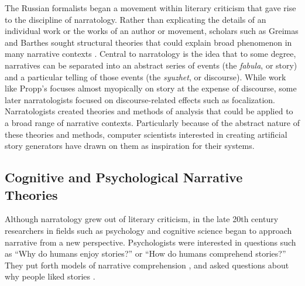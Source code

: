 The Russian formalists began a movement within literary criticism that gave rise to the discipline of narratology.
%
Rather than explicating the details of an individual work or the works of an author or movement, scholars such as Greimas and Barthes sought structural theories that could explain broad phenomenon in many narrative contexts \citep{Barthes1975,Greimas1988}.
%
Central to narratology is the idea that to some degree, narratives can be separated into an abstract series of events (the \textit{fabula}, or story) and a particular telling of those events (the \textit{syuzhet}, or discourse).
%
While work like Propp's focuses almost myopically on story at the expense of discourse, some later narratologists focused on discourse-related effects such as focalization.
%
Narratologists created theories and methods of analysis that could be applied to a broad range of narrative contexts.
%
Particularly because of the abstract nature of these theories and methods, computer scientists interested in creating artificial story generators have drawn on them as inspiration for their systems.


\subsection{Cognitive and Psychological Narrative Theories}

Although narratology grew out of literary criticism, in the late 20th century researchers in fields such as psychology and cognitive science began to approach narrative from a new perspective.
%
Psychologists were interested in questions such as ``Why do humans enjoy stories?'' or ``How do humans comprehend stories?''
%
They put forth models of narrative comprehension \citep{Kintsch1980,Brewer1982}, and asked questions about why people liked stories \citep{Iran-Nejad1987}.


